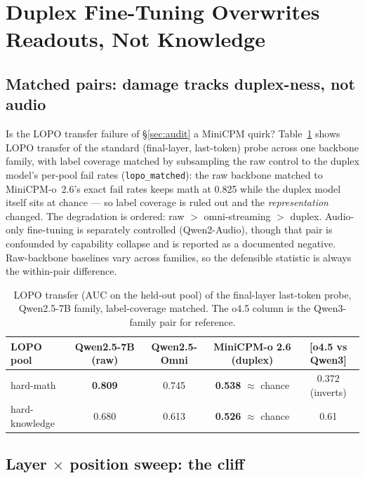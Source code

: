 \section{Duplex Fine-Tuning Overwrites Readouts, Not Knowledge}
\label{sec:duplex}

\subsection{Matched pairs: damage tracks duplex-ness, not audio}
\label{sec:pairs}

Is the LOPO transfer failure of \S\ref{sec:audit} a MiniCPM quirk?
Table~\ref{tab:lopo} shows LOPO transfer of the standard (final-layer,
last-token) probe across one backbone family, with label coverage matched by
subsampling the raw control to the duplex model's per-pool fail rates
(\texttt{lopo\_matched}): the raw backbone matched to MiniCPM-o~2.6's exact
fail rates keeps math at 0.825 while the duplex model itself sits at
chance --- so label coverage is ruled out and the \emph{representation}
changed. The degradation is ordered: raw $>$ omni-streaming $>$ duplex.
Audio-only fine-tuning is separately controlled (Qwen2-Audio), though that
pair is confounded by capability collapse and is reported as a documented
negative. Raw-backbone baselines vary across families, so the defensible
statistic is always the within-pair difference.

\begin{table}[t]
\centering\small
\caption{LOPO transfer (AUC on the held-out pool) of the final-layer
last-token probe, Qwen2.5-7B family, label-coverage matched. The o4.5
column is the Qwen3-family pair for reference.}
\label{tab:lopo}
\begin{tabular}{lcccc}
\toprule
LOPO pool & Qwen2.5-7B (raw) & Qwen2.5-Omni & MiniCPM-o 2.6 (duplex) & [o4.5 vs Qwen3] \\
\midrule
hard-math & \textbf{0.809} & 0.745 & \textbf{0.538} $\approx$ chance & 0.372 (inverts) \\
hard-knowledge & 0.680 & 0.613 & \textbf{0.526} $\approx$ chance & 0.61 \\
\bottomrule
\end{tabular}
\end{table}

\subsection{Layer $\times$ position sweep: the cliff}
\label{sec:sweep}

